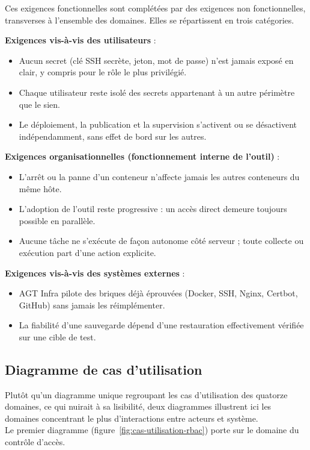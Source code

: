 Ces exigences fonctionnelles sont complétées par des exigences non
fonctionnelles, transverses à l'ensemble des domaines. Elles se répartissent
en trois catégories.

\medskip
\noindent\textbf{Exigences vis-à-vis des utilisateurs} :
\begin{itemize}
  \item Aucun secret (clé SSH secrète, jeton, mot de passe) n'est jamais exposé en
        clair, y compris pour le rôle le plus privilégié.
  \item Chaque utilisateur reste isolé des secrets appartenant à un autre
        périmètre que le sien.
  \item Le déploiement, la publication et la supervision s'activent ou se
        désactivent indépendamment, sans effet de bord sur les autres.
\end{itemize}

\medskip
\noindent\textbf{Exigences organisationnelles (fonctionnement interne de
l'outil)} :
\begin{itemize}
  \item L'arrêt ou la panne d'un conteneur n'affecte jamais les autres
        conteneurs du même hôte.
  \item L'adoption de l'outil reste progressive : un accès direct demeure toujours possible en parallèle.
  \item Aucune tâche ne s'exécute de façon autonome côté serveur ; toute
        collecte ou exécution part d'une action explicite.
\end{itemize}

\medskip
\noindent\textbf{Exigences vis-à-vis des systèmes externes} :
\begin{itemize}
  \item AGT Infra pilote des briques déjà éprouvées (Docker, SSH, Nginx,
        Certbot, GitHub) sans jamais les réimplémenter.
  \item La fiabilité d'une sauvegarde dépend d'une restauration
        effectivement vérifiée sur une cible de test.
\end{itemize}

\subsection{Diagramme de cas d'utilisation}

Plutôt qu'un diagramme unique regroupant les cas d'utilisation des
quatorze domaines, ce qui nuirait à sa lisibilité, deux diagrammes
illustrent ici les domaines concentrant le plus d'interactions entre
acteurs et système. \\
Le premier diagramme (figure~\ref{fig:cas-utilisation-rbac}) porte sur le
domaine du contrôle d'accès.

